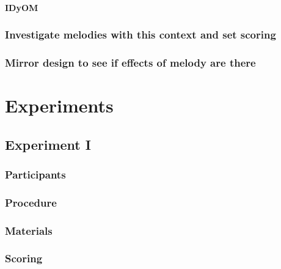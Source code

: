 \documentclass[]{book}
\let\oldparagraph\paragraph
\renewcommand{\paragraph}[1]{\oldparagraph{#1}\mbox{}}
\theoremstyle{definition}
\theoremstyle{definition}
\theoremstyle{definition}
\theoremstyle{remark}
\begin{document}
\hypertarget{idyom}{%
\paragraph{IDyOM}\label{idyom}}

\hypertarget{investigate-melodies-with-this-context-and-set-scoring}{%
\subsubsection{Investigate melodies with this context and set
scoring}\label{investigate-melodies-with-this-context-and-set-scoring}}

\hypertarget{mirror-design-to-see-if-effects-of-melody-are-there}{%
\subsubsection{Mirror design to see if effects of melody are
there}\label{mirror-design-to-see-if-effects-of-melody-are-there}}

\hypertarget{experiments-1}{%
\section{Experiments}\label{experiments-1}}

\hypertarget{experiment-i}{%
\subsection{Experiment I}\label{experiment-i}}

\hypertarget{participants-1}{%
\subsubsection{Participants}\label{participants-1}}

\hypertarget{procedure-1}{%
\subsubsection{Procedure}\label{procedure-1}}

\hypertarget{materials-1}{%
\subsubsection{Materials}\label{materials-1}}

\hypertarget{scoring}{%
\subsubsection{Scoring}\label{scoring}}
\end{document}
